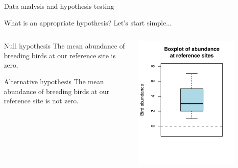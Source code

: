 \documentclass[xcolor=svgnames]{beamer}
\begin{document}
\begin{frame}{Data analysis and hypothesis testing}
\centerline{What is an appropriate hypothesis? Let's start simple...}
\vspace{0.2in}
\begin{columns}
\begin{column}{0.5\textwidth}
\begin{block}{Null hypothesis}
The mean abundance of breeding birds at our reference site is zero.
\end{block}
\vspace{0.2in}
\begin{block}{Alternative hypothesis}
The mean abundance of breeding birds at our reference site is not zero.
\end{block}
\end{column}
\begin{column}{0.5\textwidth}
\centerline{\includegraphics[width=0.85\textwidth,trim=0in 0.8in 0in 0in]{R_for_data_analysis-hyp1.pdf}}
\end{column}
\end{columns}
\end{frame}
\end{document}
